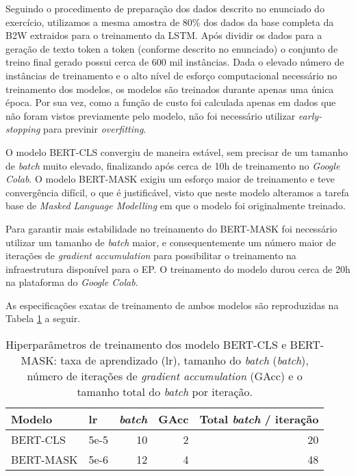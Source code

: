 \documentclass{article}
\begin{document}
Seguindo o procedimento de preparação dos dados descrito no enunciado do exercício, utilizamos a mesma amostra de 80\% dos dados da base completa da B2W extraidos para o treinamento da LSTM. Após dividir os dados para a geração de texto token a token (conforme descrito no enunciado) o conjunto de treino final gerado possui cerca de 600 mil instâncias. Dada o elevado número de instâncias de treinamento e o alto nível de esforço computacional necessário no treinamento dos modelos, os modelos são treinados durante apenas uma única época. Por sua vez, como a função de custo foi calculada apenas em dados que não foram vistos previamente pelo modelo, não foi necessário utilizar \textit{early-stopping} para previnir \textit{overfitting}.

O modelo BERT-CLS convergiu de maneira estável, sem precisar de um tamanho de \textit{batch} muito elevado, finalizando após cerca de 10h de treinamento no \textit{Google Colab}. O modelo BERT-MASK exigiu  um esforço maior de treinamento e teve convergência difícil, o que é justificável, visto que neste modelo alteramos a tarefa base de \textit{Masked Language Modelling} em que o modelo foi originalmente treinado. 

Para garantir mais estabilidade no treinamento do BERT-MASK foi necessário utilizar um tamanho de \textit{batch} maior, e consequentemente um número maior de iterações de \textit{gradient accumulation} para possibilitar o treinamento na infraestrutura disponível para o EP. O treinamento do modelo durou cerca de 20h na plataforma do \textit{Google Colab}.


As especificações exatas de treinamento de ambos modelos são reproduzidas na Tabela \ref{hyp} a seguir.

\begin{table}[h!]
	\centering
	\begin{tabular}{@{}lrrrr@{}}
		\toprule
		Modelo    & \multicolumn{1}{l}{lr} & \multicolumn{1}{l}{ \textit{batch}} & \multicolumn{1}{l}{GAcc} & \multicolumn{1}{l}{Total \textit{batch} / iteração} \\ \midrule
		BERT-CLS  & 5e-5                   & 10                                & 2                        & 20                                                 \\
		BERT-MASK & 5e-6                   & 12                                & 4                        & 48                                                 \\ \bottomrule
	\end{tabular}
	\caption{Hiperparâmetros de treinamento dos modelo BERT-CLS e BERT-MASK: taxa de aprendizado (lr), tamanho do \textit{batch} (\textit{batch}), número de iterações de \textit{gradient accumulation} (GAcc) e o tamanho total do \textit{batch} por iteração.}
	\label{hyp}
\end{table}
\end{document}

